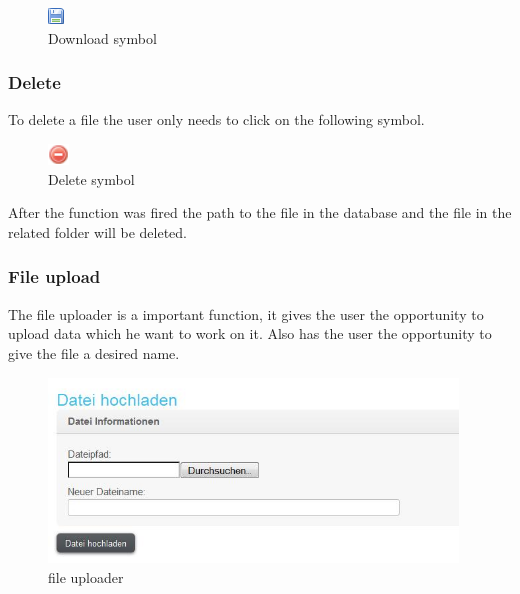 \begin{figure}[!ht]
  \centering
    \includegraphics{images/disk.png}
  \caption{Download symbol}
  \label{fig:download symbol}
\end{figure}

\subsubsection{Delete}

To delete a file the user only needs to click on the following symbol.

\begin{figure}[!ht]
  \centering
    \includegraphics[width=0.05\textwidth]{images/delete.png}
  \caption{Delete symbol}
  \label{fig:delete symbol}
\end{figure}

After the function was fired the path to the file in the database and the file in the related folder will be deleted.

\subsubsection{File upload}

The file uploader is a important function, it gives the user the opportunity to upload data which he want to work on 
it. Also has the user the opportunity to give the file a desired name.

\begin{figure}[!ht]
  \centering
    \includegraphics[width=0.97\textwidth]{images/basic_functionalities/datei_hochladen.jpg}
  \caption{file uploader}
  \label{fig:file uploader}
\end{figure}

